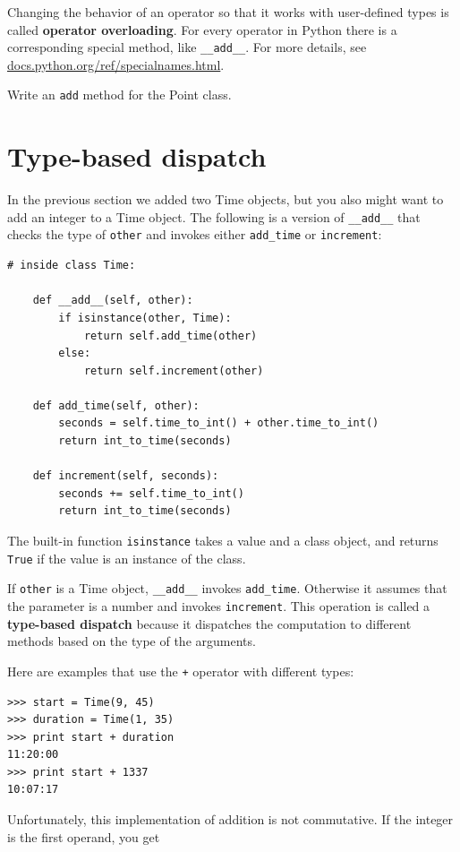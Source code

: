 \documentclass[10pt]{book}
\begin{document}
\begin{CJK}{UTF8}{gbsn}
Changing the behavior of an operator so that it works with
user-defined types is called {\bf operator overloading}.  For every
operator in Python there is a corresponding special method, like 
\verb"__add__".  For more details, see
\url{docs.python.org/ref/specialnames.html}.

\begin{exercise}

Write an {\tt add} method for the Point class.  

\end{exercise}


\section{Type-based dispatch}

In the previous section we added two Time objects, but you
also might want to add an integer to a Time object.  The
following is a version of \verb"__add__"
that checks the type of {\tt other} and invokes either
\verb"add_time" or {\tt increment}:

\begin{verbatim}
# inside class Time:

    def __add__(self, other):
        if isinstance(other, Time):
            return self.add_time(other)
        else:
            return self.increment(other)

    def add_time(self, other):
        seconds = self.time_to_int() + other.time_to_int()
        return int_to_time(seconds)

    def increment(self, seconds):
        seconds += self.time_to_int()
        return int_to_time(seconds)
\end{verbatim}
%
The built-in function {\tt isinstance} takes a value and a
class object, and returns {\tt True} if the value is an instance
of the class.

If {\tt other} is a Time object, \verb"__add__" invokes
\verb"add_time".  Otherwise it assumes that the parameter
is a number and invokes {\tt increment}.  This operation is
called a {\bf type-based dispatch} because it dispatches the
computation to different methods based on the type of the
arguments.

Here are examples that use the {\tt +} operator with different
types:

\begin{verbatim}
>>> start = Time(9, 45)
>>> duration = Time(1, 35)
>>> print start + duration
11:20:00
>>> print start + 1337
10:07:17
\end{verbatim}
%
Unfortunately, this implementation of addition is not commutative.
If the integer is the first operand, you get


\end{CJK}
\end{document}
